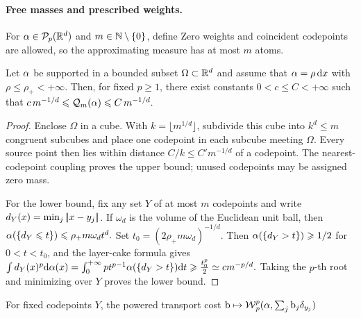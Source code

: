 \paragraph{Free masses and prescribed weights.}
\begin{defn}\label{def-optimal-quantization}
For $\alpha\in\mathcal{P}_p(\mathbb{R}^d)$ and $m\in\mathbb{N}\setminus\{0\}$, define
Zero weights and coincident codepoints are allowed, so the approximating measure has at most $m$ atoms.
\end{defn}
\begin{prop}\label{prop-quantization-rate}
Let $\alpha$ be supported in a bounded subset $\Omega\subset\mathbb{R}^d$ and assume that $\alpha=\rho\,\mathrm{d} x$ with $\rho\leq\rho_+<+\infty$. Then, for fixed $p\geq1$, there exist constants $0<c\leq C<+\infty$ such that
\(c\,m^{-1/d} \leqslant \mathcal{Q}_m(\alpha) \leqslant C\,m^{-1/d}.\)
\end{prop}
\begin{proof}
Enclose $\Omega$ in a cube. With $k=\lfloor m^{1/d}\rfloor$, subdivide this cube into $k^d\leq m$ congruent subcubes and place one codepoint in each subcube meeting $\Omega$. Every source point then lies within distance $C/k\leq C'm^{-1/d}$ of a codepoint. The nearest-codepoint coupling proves the upper bound; unused codepoints may be assigned zero mass.

For the lower bound, fix any set $Y$ of at most $m$ codepoints and write $d_Y(x)=\min_j|\!| x-y_j |\!|$. If $\omega_d$ is the volume of the Euclidean unit ball, then
\(
\alpha(\{d_Y\leqslant t\})\leqslant \rho_+m\omega_dt^d.
\)
Set $t_0=(2\rho_+m\omega_d)^{-1/d}$. Then $\alpha(\{d_Y>t\})\geqslant1/2$ for $0<t<t_0$, and the layer-cake formula gives \(\int d_Y(x)^p\mathrm{d}\alpha(x) = \int_0^{+\infty} p t^{p-1}\alpha(\{d_Y>t\})\mathrm{d} t \geqslant \frac{t_0^p}{2} \simeq c m^{-p/d}.\)
Taking the $p$-th root and minimizing over $Y$ proves the lower bound.
\end{proof}
For fixed codepoints $Y$, the powered transport cost
\(
\mathrm{b}\mapsto\operatorname{\mathcal{W}}_p^p(\alpha,\sum_j\mathrm{b}_j\delta_{y_j})
\)
